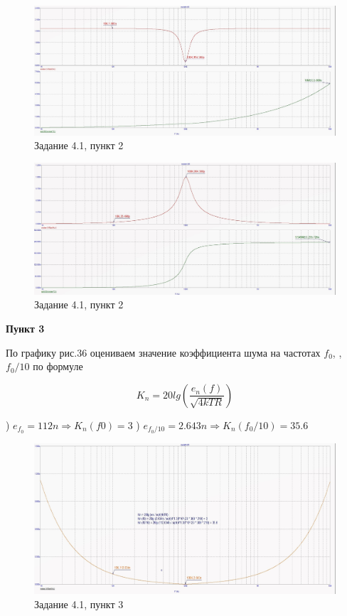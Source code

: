 \documentclass[a4paper, 14pt]{extarticle}%
\begin{document}
\begin{figure}[h!]
			\centering
			\includegraphics[width=1.1\linewidth]{4/4_1_5.jpg}
			\caption{Задание 4.1, пункт 2}
			\label{A}
\end{figure}



\begin{figure}[h!]
			\centering
			\includegraphics[width=1.1\linewidth]{4/4_1_4.jpg}
			\caption{Задание 4.1, пункт 2}
			\label{A}
\end{figure}


\textbf{Пункт 3}
\newline


По графику рис.36 оцениваем значение коэффициента шума на частотах $f_0$, \:, \: $f_0/10$ по формуле
\newline

\[  K_n = 20lg(\frac{e_n(f)}{\sqrt{4kTR}})   \]

) $e_{f_0}= 112n \Rightarrow K_n(f0) = 3$
) $e_{f_0/10}= 2.643n \Rightarrow K_n(f_0/10) = 35.6 $
\newline


\begin{figure}[h!]
			\centering
			\includegraphics[width=1.1\linewidth]{4/4_1_1.jpg}
			\caption{Задание 4.1, пункт 3}
			\label{A}
\end{figure}
\end{document}
